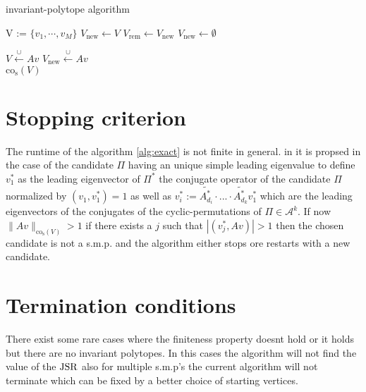 \vspace{1cm}

\FloatBarrier

\begin{algorithm}
\caption{invariant-polytope algorithm}
\label{alg:exact}
\begin{algorithmic}

\State V := $\{v_1, \cdots, v_M\}$
\State $V_{\text{new}} \gets V$
\State $V_{\text{rem}} \gets V_{\text{new}}$
\State $V_{\text{new}} \gets \emptyset$

\State $V \xleftarrow{\cup} Av$
\State $V_{\text{new}} \xleftarrow{\cup} Av$
\EndIf
\EndFor
\EndFor
\EndWhile \\
\Return $\text{co}_{\text{s}}(V)$ \\
\end{algorithmic} 
\end{algorithm}



\section{Stopping criterion}
The runtime of the algorithm \ref{alg:exact} is not finite in general. 
in \citep{guglielmiExactComputationJoint2013} it is propsed in the case of the candidate $\Pi$ having an unique simple leading eigenvalue to define $v_1^{*}$ as the leading eigenvector of $\Pi^{*}$ the conjugate operator of the candidate $\Pi$ normalized by $(v_1, v_1^{*}) = 1$ as well as $v_i^{*} := \tilde{A_{d_i}^{*}} \cdot ... \cdot \tilde{A_{d_k}^{*}} v_1^{*}$ which are the leading eigenvectors of the conjugates of the cyclic-permutations of $\Pi \in \mathcal{A}^k$.
If now $\lVert Av \rVert _{\text{co}_{\text{s}}(V)}  > 1$ if there exists a $j$
such that $| ( v_j^{*}, Av) | > 1$ then the chosen candidate is not a s.m.p. and the algorithm either stops ore restarts with a new candidate. 

\section{Termination conditions}
There exist some rare cases where the finiteness property doesnt hold or it holds but there are no invariant polytopes. In this cases the algorithm will not find the value of the $\operatorname{JSR}$ also for multiple s.m.p's the current algorithm will not terminate which can be fixed by a better choice of starting vertices.

